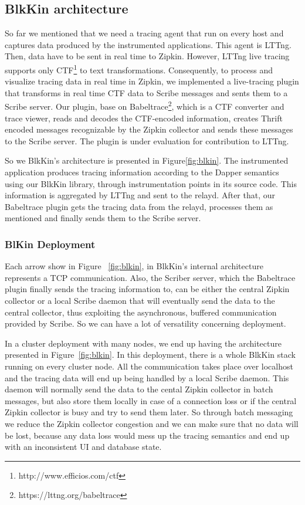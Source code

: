 \documentclass[a4paper,10pt,twocolumn]{article}
\begin{document}
\subsection{BlkKin architecture}
So far we mentioned that we need a tracing agent that run on every host and
captures data produced by the instrumented applications. This agent is LTTng.
Then, data have to be sent in real time to Zipkin. However, LTTng live tracing
supports only CTF\footnote{http://www.efficios.com/ctf} to text
transformations. Consequently, to process and visualize tracing data in real
time in Zipkin, we implemented a live-tracing plugin that transforms in real
time CTF data to Scribe messages and sents them to a Scribe server. Our plugin,
base on Babeltrace\footnote{https://lttng.org/babeltrace}, which is a CTF
converter and trace viewer, reads and decodes the CTF-encoded information,
creates Thrift encoded messages recognizable by the Zipkin collector and sends
these messages to the Scribe server. The plugin is under evaluation for
contribution to LTTng.

So we BlkKin's architecture is presented in Figure\ref{fig:blkin}. The
instrumented application produces tracing information according to the Dapper
semantics using our BlkKin library, through instrumentation points in its source
code. This information is aggregated by LTTng and sent to the relayd. After
that, our Babeltrace plugin gets the tracing data from the relayd, processes
them as mentioned and finally sends them to the Scribe server.

\subsubsection{BlKin Deployment} Each arrow show in Figure ~\ref{fig:blkin}, in
BlkKin's internal architecture represents a TCP communication. Also, the
Scriber server, which the Babeltrace plugin finally sends the tracing
information to, can be either the central Zipkin collector or a local Scribe
daemon that will eventually send the data to the central collector, thus
exploiting the asynchronous, buffered communication provided by Scribe. So we
can have a lot of versatility concerning deployment.

In a cluster deployment with many nodes, we end up having the architecture
presented in Figure~\ref{fig:blkin}. In this deployment, there is a whole
BlkKin stack running on every cluster node. All the communication takes place
over localhost and the tracing data will end up being handled by a local Scribe
daemon. This daemon will normally send the data to the cental Zipkin collector
in batch messages, but also store them locally in case of a connection loss or
if the central Zipkin collector is busy and try to send them later. So through
batch messaging we reduce the Zipkin collector congestion and we can make sure
that no data will be lost, because any data loss would mess up the tracing
semantics and end up with an inconsistent UI and database state.
\end{document}
